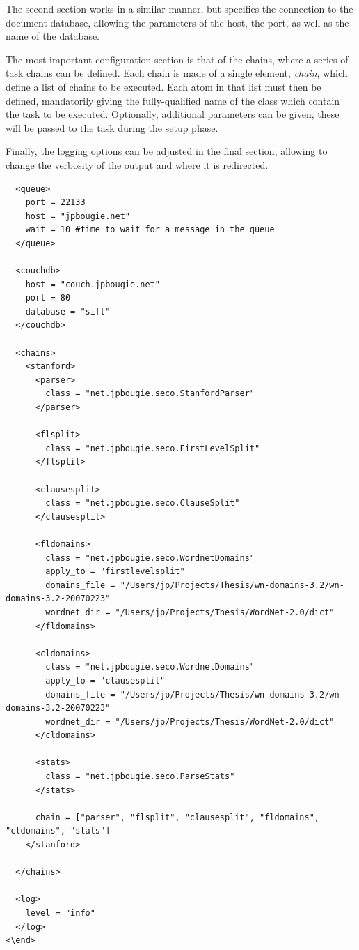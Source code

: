 The second section works in a similar manner, but specifies the connection to the document database, allowing the parameters of the host, the port, as well as the name of the database.

The most important configuration section is that of the chains, where a series of task chains can be defined. Each chain is made of a single element, \emph{chain}, which define a list of chains to be executed. Each atom in that list must then be defined, mandatorily giving the fully-qualified name of the class which contain the task to be executed. Optionally, additional parameters can be given, these will be passed to the task during the setup phase.

Finally, the logging options can be adjusted in the final section, allowing to change the verbosity of the output and where it is redirected.

\begin{verbatim}
  <queue>
    port = 22133
    host = "jpbougie.net"
    wait = 10 #time to wait for a message in the queue
  </queue>

  <couchdb>
    host = "couch.jpbougie.net"
    port = 80
    database = "sift"
  </couchdb>

  <chains>
    <stanford>
      <parser>
        class = "net.jpbougie.seco.StanfordParser"
      </parser>

      <flsplit>
        class = "net.jpbougie.seco.FirstLevelSplit"
      </flsplit>

      <clausesplit>
        class = "net.jpbougie.seco.ClauseSplit"
      </clausesplit>

      <fldomains>
        class = "net.jpbougie.seco.WordnetDomains"
        apply_to = "firstlevelsplit"
        domains_file = "/Users/jp/Projects/Thesis/wn-domains-3.2/wn-domains-3.2-20070223"
        wordnet_dir = "/Users/jp/Projects/Thesis/WordNet-2.0/dict"
      </fldomains>

      <cldomains>
        class = "net.jpbougie.seco.WordnetDomains"
        apply_to = "clausesplit"
        domains_file = "/Users/jp/Projects/Thesis/wn-domains-3.2/wn-domains-3.2-20070223"
        wordnet_dir = "/Users/jp/Projects/Thesis/WordNet-2.0/dict"
      </cldomains>

      <stats>
        class = "net.jpbougie.seco.ParseStats"
      </stats>

      chain = ["parser", "flsplit", "clausesplit", "fldomains", "cldomains", "stats"]
    </stanford>

  </chains>

  <log>
    level = "info"
  </log>
<\end>

\end{verbatim}

